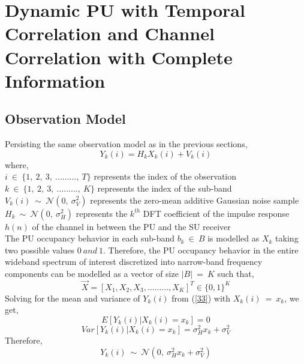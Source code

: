 \documentclass[12pt, draftcls, onecolumn]{IEEEtran}
\begin{document}
\section{Dynamic PU with Temporal Correlation and Channel Correlation with Complete Information}
\subsection{Observation Model}
Persisting the same observation model as in the previous sections,
\begin{equation}\label{33}
    Y_k(i) = H_kX_k(i) + V_k(i)
\end{equation}
where,
\\$i\ \in\ \{1,\ 2,\ 3,\ .........,\ T\}$ represents the index of the observation
\\$k\ \in\ \{1,\ 2,\ 3,\ .........,\ K\}$ represents the index of the sub-band
\\$V_k(i)\ \sim\ \mathcal{N}(0,\ \sigma_V^2)$ represents the zero-mean additive Gaussian noise sample
\\$H_k\ \sim\ \mathcal{N}(0,\ \sigma_H^2)$ represents the $k^{th}$ DFT coefficient of the impulse response $h(n)$ of the channel in between the PU and the SU receiver
\\The PU occupancy behavior in each sub-band $b_k\ \in\ B$ is modelled as $X_k$ taking two possible values $0\ and\ 1$. Therefore, the PU occupancy behavior in the entire wideband spectrum of interest discretized into narrow-band frequency components can be modelled as a vector of size $|B|\ =\ K$ such that,
\begin{equation}\label{34}
    \vec{X} = [X_1, X_2, X_3, ........., X_K]^T \in \{0,1\}^K
\end{equation}
Solving for the mean and variance of $Y_k(i)$ from (\ref{33}) with $X_k(i)\ =\ x_k$, we get,
\begin{equation}\label{35}
    E[Y_k(i) | X_k(i) = x_k] = 0
\end{equation}
\begin{equation}\label{36}
    Var[Y_k(i) | X_k(i) = x_k] = \sigma_H^2x_k + \sigma_V^2
\end{equation}
Therefore,
\[Y_k(i)\ \sim\ \mathcal{N}(0,\ \sigma_H^2x_k + \sigma_V^2)\]
\end{document}
